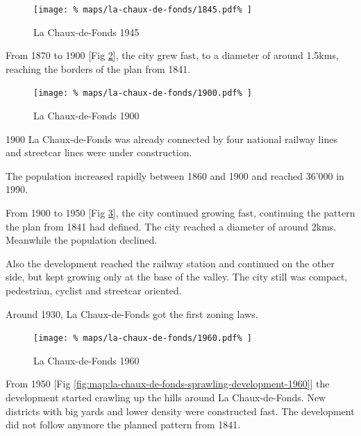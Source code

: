 \documentclass{article}
\begin{document}
\begin{multicols}{2}
			\begin{figure}[H]
				\texttt{[image: \%
					maps/la-chaux-de-fonds/1845.pdf\%
				]}
				\caption{La Chaux-de-Fonds 1945  \cite{MapGeoAdmin:LaChauxDeFonds}}
				\label{fig:map:la-chaux-de-fonds-1945}
			\end{figure}	
			
			From 1870 to 1900 [Fig \ref{fig:map:la-chaux-de-fonds-1900}], the city grew fast, to a diameter of around 1.5kms, reaching the borders of the plan from 1841.
			
			\begin{figure}[H]
				\texttt{[image: \%
					maps/la-chaux-de-fonds/1900.pdf\%
				]}
				\caption{La Chaux-de-Fonds 1900  \cite{MapGeoAdmin:LaChauxDeFonds}}
				\label{fig:map:la-chaux-de-fonds-1900}
			\end{figure}
			
			1900 La Chaux-de-Fonds was already connected by four national railway lines and streetcar lines were under construction.
			
			
			The population increased rapidly between 1860 and 1900 and reached 36'000 in 1990.

			

			From 1900 to 1950 [Fig \ref{fig:map:la-chaux-de-fonds-1960}], the city continued growing fast, continuing the pattern the plan from 1841 had defined. The city reached a diameter of around 2kms. Meanwhile the population declined.
			
			Also the development reached the railway station and continued on the other side, but kept growing only at the base of the valley.
			The city still was compact, pedestrian, cyclist and streetcar oriented.
			
			Around 1930, La Chaux-de-Fonds got the first zoning laws.
			
			\begin{figure}[H]
				\texttt{[image: \%
					maps/la-chaux-de-fonds/1960.pdf\%
				]}
				\caption{La Chaux-de-Fonds 1960  \cite{MapGeoAdmin:LaChauxDeFonds}}
				\label{fig:map:la-chaux-de-fonds-1960}
			\end{figure}
			
			
			From 1950 [Fig \ref{fig:map:la-chaux-de-fonds-sprawling-development-1960}] the development started crawling up the hills around La Chaux-de-Fonds.
			New districts with big yards and lower density were constructed fast.
			The development did not follow anymore the planned pattern from 1841.
			

\end{multicols}
\end{document}
